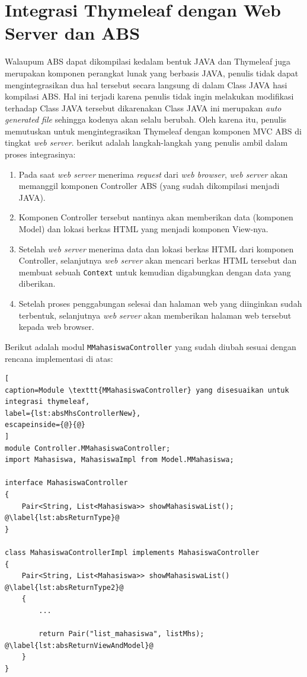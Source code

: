 \section{Integrasi Thymeleaf dengan Web Server dan ABS}

Walaupum ABS dapat dikompilasi kedalam bentuk JAVA dan Thymeleaf juga merupakan komponen perangkat lunak yang berbasis JAVA, penulis tidak dapat mengintegrasikan dua hal tersebut secara langsung di dalam Class JAVA hasi kompilasi ABS. Hal ini terjadi karena penulis tidak ingin melakukan modifikasi terhadap Class JAVA tersebut dikarenakan Class JAVA ini merupakan \textit{auto generated file} sehingga kodenya akan selalu berubah. Oleh karena itu, penulis memutuskan untuk mengintegrasikan Thymeleaf dengan komponen MVC ABS di tingkat \textit{web server}. berikut adalah langkah-langkah yang penulis ambil dalam proses integrasinya:

\begin{enumerate}
    \item Pada saat \textit{web server} menerima \textit{request} dari \textit{web browser}, \textit{web server} akan memanggil komponen Controller ABS (yang sudah dikompilasi menjadi JAVA).
    \item Komponen Controller tersebut nantinya akan memberikan data (komponen Model) dan lokasi berkas HTML yang menjadi komponen View-nya.
    \item Setelah \textit{web server} menerima data dan lokasi berkas HTML dari komponen Controller, selanjutnya \textit{web server} akan mencari berkas HTML tersebut dan membuat sebuah \texttt{Context} untuk kemudian digabungkan dengan data yang diberikan.
    \item Setelah proses penggabungan selesai dan halaman web yang diinginkan sudah terbentuk, selanjutnya \textit{web server} akan memberikan halaman web tersebut kepada web browser.
\end{enumerate}

Berikut adalah modul \texttt{MMahasiswaController} yang sudah diubah sesuai dengan rencana implementasi di atas:

\begin{lstlisting}[
caption=Module \texttt{MMahasiswaController} yang disesuaikan untuk integrasi thymeleaf,
label={lst:absMhsControllerNew},
escapeinside={@}{@}
]
module Controller.MMahasiswaController;
import Mahasiswa, MahasiswaImpl from Model.MMahasiswa;

interface MahasiswaController
{
	Pair<String, List<Mahasiswa>> showMahasiswaList(); @\label{lst:absReturnType}@
}

class MahasiswaControllerImpl implements MahasiswaController
{
	Pair<String, List<Mahasiswa>> showMahasiswaList() @\label{lst:absReturnType2}@
	{
		...
		
		return Pair("list_mahasiswa", listMhs); @\label{lst:absReturnViewAndModel}@
	}
}
\end{lstlisting}

